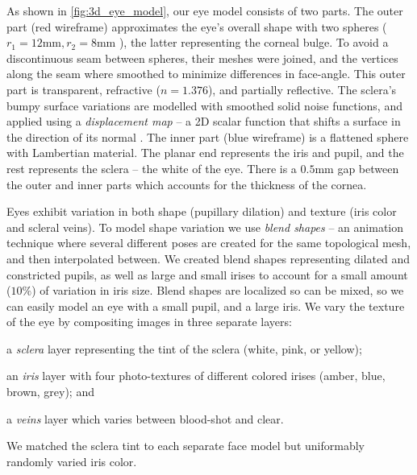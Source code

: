 As shown in \autoref{fig:3d_eye_model}, our eye model consists of two parts.
The outer part (red wireframe) approximates the eye's overall shape with two spheres ($r_1\!=\!12\textrm{mm}, r_2\!=\!8\textrm{mm}$ \cite{ruhland2014look}), the latter representing the corneal bulge.
To avoid a discontinuous seam between spheres, their meshes were joined, and the vertices along the seam where smoothed to minimize differences in face-angle.
This outer part is transparent, refractive ($n\!=\!1.376$), and partially reflective.
The sclera's bumpy surface variations are modelled with smoothed solid noise functions, and applied using a \emph{displacement map} -- a 2D scalar function that shifts a surface in the direction of its normal \cite{lee2000displaced}.
The inner part (blue wireframe) is a flattened sphere with Lambertian material.
The planar end represents the iris and pupil, and the rest represents the sclera -- the white of the eye.
There is a $0.5\textrm{mm}$ gap between the outer and inner parts which accounts for the thickness of the cornea.

Eyes exhibit variation in both shape (pupillary dilation) and texture (iris color and scleral veins).
To model shape variation we use \emph{blend shapes} -- an animation technique where several different poses are created for the same topological mesh, and then interpolated between\cite{orvalho2012facial}. 
We created blend shapes representing dilated and constricted pupils, as well as large and small irises to account for a small amount ($10\%$) of variation in iris size.
Blend shapes are localized so can be mixed, so we can easily model an eye with a small pupil, and a large iris.
We vary the texture of the eye by compositing images in three separate layers:
\begin{inparaenum}
\item a \emph{sclera} layer representing the tint of the sclera (white, pink, or yellow);
\item an \emph{iris} layer with four photo-textures of different colored irises (amber, blue, brown, grey); and
\item a \emph{veins} layer which varies between blood-shot and clear.
\end{inparaenum}
We matched the sclera tint to each separate face model but uniformably randomly varied iris color.

